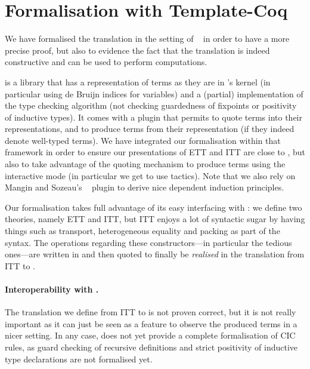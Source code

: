 \section{Formalisation with Template-Coq}
\label{sec:form-with-templ}

We have formalised the translation
in the setting of \TemplateCoq~\cite{DBLP:conf/itp/AnandBCST18} in order to have
a more precise proof, but also to evidence the fact that the translation is
indeed constructive and can be used to perform computations.

\TemplateCoq is a \Coq library that has a representation of \Coq terms
as they are in \Coq's kernel (in particular using de Bruijn indices for
variables) and a (partial) implementation of the type checking algorithm
(not checking guardedness of fixpoints or positivity of inductive types).
%
It comes with a \Coq plugin that permits to quote \Coq terms into their
representations, and to produce \Coq terms from their representation
(if they indeed denote well-typed terms).
%
We have integrated our formalisation within that framework in order to
ensure our presentations of ETT and ITT are close to \Coq, but also to
take advantage of the quoting mechanism to produce terms using
the interactive mode (in particular we get to use tactics).
%
Note that we also rely on Mangin and Sozeau's
\Equations{}~\cite{DBLP:conf/itp/Sozeau10} plugin to derive nice
dependent induction principles.

Our formalisation takes full advantage of its easy interfacing with \TemplateCoq:
we define two theories, namely ETT and ITT, but ITT enjoys a lot of syntactic
sugar by having things such as transport, heterogeneous equality and packing as
part of the syntax. The operations regarding these constructors---in particular
the tedious ones---are written in \Coq and then quoted to finally be
\emph{realised} in the translation from ITT to \TemplateCoq.

\paragraph{Interoperability with \TemplateCoq.}
The translation we define from ITT to \TemplateCoq is not proven
correct, but it is not really important as it can just be seen as a
feature to observe the produced terms in a nicer setting. In any case,
\TemplateCoq does not yet provide a complete formalisation of CIC rules,
as guard checking of recursive definitions and strict positivity of
inductive type declarations are not formalised yet.

